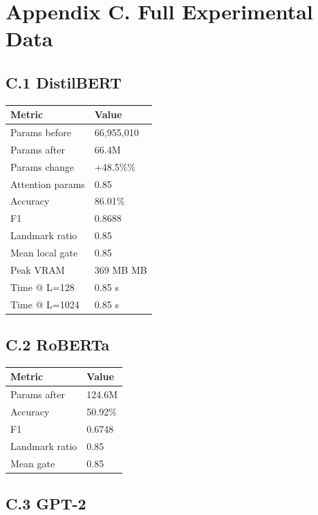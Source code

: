 \section{Appendix C. Full Experimental Data}

\subsection{C.1 DistilBERT}

\begin{table}[H]
\centering
\small
\begin{tabular}{ll}
\toprule
\textbf{Metric} & \textbf{Value} \\
\midrule
Params before & 66,955,010 \\
Params after & 66.4M \\
Params change & +48.5\%\% \\
Attention params & 0.85 \\
Accuracy & 86.01\% \\
F1 & 0.8688 \\
Landmark ratio & 0.85 \\
Mean local gate & 0.85 \\
Peak VRAM & 369 MB MB \\
Time @ L=128 & 0.85 s \\
Time @ L=1024 & 0.85 s \\
\bottomrule
\end{tabular}
\end{table}

\subsection{C.2 RoBERTa}

\begin{table}[H]
\centering
\small
\begin{tabular}{ll}
\toprule
\textbf{Metric} & \textbf{Value} \\
\midrule
Params after & 124.6M \\
Accuracy & 50.92\% \\
F1 & 0.6748 \\
Landmark ratio & 0.85 \\
Mean gate & 0.85 \\
\bottomrule
\end{tabular}
\end{table}

\subsection{C.3 GPT-2}

